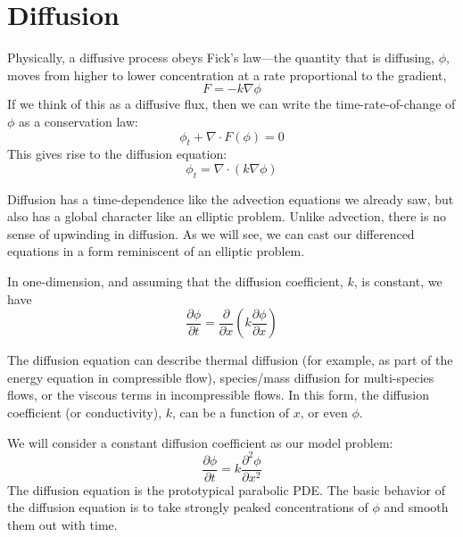\label{ch:diffusion}

\section{Diffusion}

\label{sec:diffusion}

Physically, a diffusive process obeys Fick's law---the quantity that is
diffusing, $\phi$, moves from higher to lower concentration at a rate
proportional to the gradient,
\begin{equation}
  F = - k \nabla \phi
\end{equation}
If we think of this as a diffusive flux, then we can write the time-rate-of-change of $\phi$ as a conservation law:
\begin{equation}
  \phi_t + \nabla\cdot F(\phi) = 0
\end{equation}
This gives rise to the diffusion equation:
\begin{equation}
\phi_t = \nabla \cdot (k \nabla \phi)
\end{equation}

Diffusion has a time-dependence like the advection equations we
already saw, but also has a global character like an elliptic problem.
Unlike advection, there is no sense of upwinding in diffusion.  As we
will see, we can cast our differenced equations in a form reminiscent
of an elliptic problem.

In one-dimension, and assuming that the diffusion coefficient, $k$, is 
constant, we have
\begin{equation}
\frac{\partial \phi}{\partial t} = 
  \frac{\partial }{\partial x} 
  \left ( k \frac{\partial \phi}{\partial x} \right )
\end{equation}


The diffusion equation can describe thermal diffusion (for example, as
part of the energy equation in compressible flow), species/mass
diffusion for multi-species flows, or the viscous terms in
incompressible flows.  In this form, the diffusion coefficient (or
conductivity), $k$, can be a function of $x$, or even $\phi$.  


We will consider a constant diffusion coefficient as our model problem:
\begin{equation}
\frac{\partial \phi}{\partial t} = k \frac{\partial^2 \phi}{\partial x^2}
\end{equation}
The diffusion equation is the prototypical parabolic PDE.
The basic behavior of the diffusion equation is to take strongly peaked
concentrations of $\phi$ and smooth them out with time.

